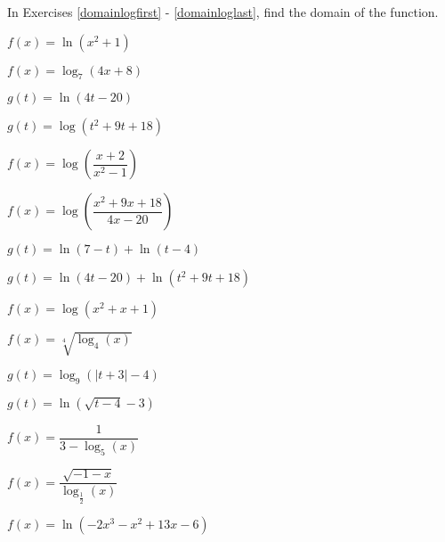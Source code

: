 \documentclass{ximera}
\begin{document}
\begin{problem}
In Exercises \ref{domainlogfirst} - \ref{domainloglast}, find the domain of the function.

\begin{question}\label{domainlogfirst}
$f(x) = \ln(x^{2} + 1)$
\end{question}

\begin{question}
$f(x) = \log_{7}(4x + 8)$
\end{question}

\begin{question}
$g(t) = \ln(4t-20)$
\end{question}

\begin{question}
$g(t) = \log \left(t^2+9t+18\right)$
\end{question}

\begin{question}
$f(x) = \log \left(\dfrac{x + 2}{x^{2} - 1}\right)$
\end{question}

\begin{question}
$f(x) = \log\left(\dfrac{x^2+9x+18}{4x-20}\right)$
\end{question}

\begin{question}
$g(t) = \ln(7 - t) + \ln(t - 4)$
\end{question}

\begin{question}
$g(t) = \ln(4t-20) + \ln\left(t^2+9t+18\right)$
\end{question}

\begin{question}
$f(x) = \log\left(x^2+x+1\right)$
\end{question}

\begin{question}
$f(x) = \sqrt[4]{\log_{4} (x)}$
\end{question}

\begin{question}
$g(t) = \log_{9}(|t + 3| - 4)$
\end{question}

\begin{question}
$g(t) = \ln(\sqrt{t - 4} - 3)$
\end{question}

\begin{question}
$f(x) = \dfrac{1}{3 - \log_{5} (x)}$
\end{question}

\begin{question}
$f(x) = \dfrac{\sqrt{-1 - x}}{\log_{\frac{1}{2}} (x)}$
\end{question}

\begin{question}\label{domainloglast}
$f(x) = \ln(-2x^{3} - x^{2} + 13x - 6)$  
\end{question}

\end{problem}
\end{document}
